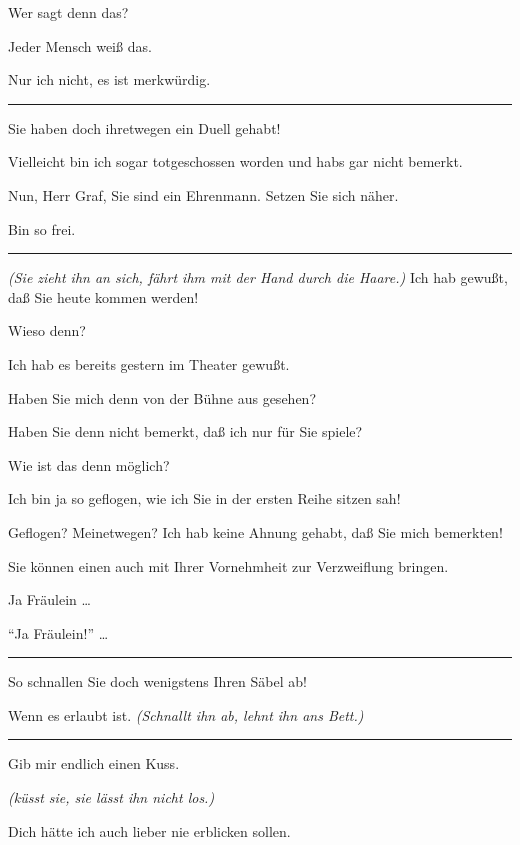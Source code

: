 \documentclass[
	final,
	a4paper,
	ngerman,
	mpinclude = true, %
	twoside = true,
	open = right,
	cleardoublepage = plain,
	DIV = 13,
	BCOR = 1cm,
	titlepage = firstiscover,
	]{scrbook}
\newcommand{\direction}[1]{\textit{(#1)}}
\newenvironment{deletion}{%
		\vspace{0.25\baselineskip}
		\hrule
		\vspace{0.25\baselineskip}
		\color{darkgray}
	}{
		\color{black}
		\vspace{0.25\baselineskip}
		\hrule 
		\vspace{0.25\baselineskip}
	}
\newcommand{\thecharacter}[1]{\textup{\textsc{#1}}\xspace}
\newcommand{\theschauspielerin}{\thecharacter{Daniela}}
\newcommand{\theentrepeneurin}{\thecharacter{Katerina Albrecht}}
\newcommand{\character}[1]{\item[#1:]}
\newcommand{\schauspielerin}{\character{\theschauspielerin}}
\newcommand{\entrepeneurin}{\character{\theentrepeneurin}}
\begin{document}
\begin{play}
	\entrepeneurin
	Wer sagt denn das?

	\schauspielerin
	Jeder Mensch weiß das.

	\entrepeneurin
	Nur ich nicht, es ist merkwürdig.

	\begin{deletion}
	\schauspielerin
	Sie haben doch ihretwegen ein Duell gehabt!

	\entrepeneurin
	Vielleicht bin ich sogar totgeschossen worden und habs gar nicht bemerkt.

	\schauspielerin
	Nun, Herr Graf, Sie sind ein Ehrenmann. Setzen Sie sich näher.

	\entrepeneurin
	Bin so frei.

	\end{deletion}
	\schauspielerin
	\direction{Sie zieht ihn an sich, fährt ihm mit der Hand durch die Haare.} Ich hab gewußt, daß Sie heute kommen werden!

	\entrepeneurin
	Wieso denn?

	\schauspielerin
	Ich hab es bereits gestern im Theater gewußt.

	\entrepeneurin
	Haben Sie mich denn von der Bühne aus gesehen?

	\schauspielerin
	Haben Sie denn nicht bemerkt, daß ich nur für Sie spiele?

	\entrepeneurin
	Wie ist das denn möglich?

	\schauspielerin
	Ich bin ja so geflogen, wie ich Sie in der ersten Reihe sitzen sah!

	\entrepeneurin
	Geflogen? Meinetwegen? Ich hab keine Ahnung gehabt, daß Sie mich bemerkten!

	\schauspielerin
	Sie können einen auch mit Ihrer Vornehmheit zur Verzweiflung bringen.

	\entrepeneurin
	Ja Fräulein \ldots{}

	\schauspielerin
	\enquote{Ja Fräulein!} \ldots{}
	\begin{deletion}
	So schnallen Sie doch wenigstens Ihren Säbel ab!

	\entrepeneurin
	Wenn es erlaubt ist. \direction{Schnallt ihn ab, lehnt ihn ans Bett.}

	\end{deletion}
	\schauspielerin
	Gib mir endlich einen Kuss.

	\entrepeneurin
	\direction{küsst sie, sie lässt ihn nicht los.}

	\schauspielerin
	Dich hätte ich auch lieber nie erblicken sollen.


\end{play}
\end{document}
